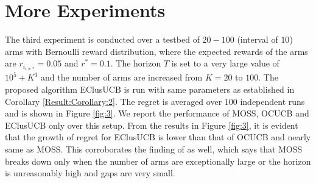 \section{More Experiments}
\label{App:MoreExp}

The third experiment is conducted over a testbed of $20-100$ (interval of $10$) arms with Bernoulli reward distribution, where the expected rewards of the arms are $r_{i_{{i}\neq {*}}}=0.05$ and $r^{*}=0.1$. The horizon $T$ is set to a very large value of $10^{5} + K^{3}$ and the number of arms are increased from $K=20$ to $100$. The proposed algorithm EClusUCB is run with same parameters as established in Corollary  \ref{Result:Corollary:2}. The regret is averaged over $100$ independent runs and is shown in Figure \ref{fig:3}. We report the performance of MOSS, OCUCB and EClusUCB only over this setup. From the results in Figure \ref{fig:3}, it is evident that the growth of regret for EClusUCB is lower than that of OCUCB and nearly same as MOSS. This corroborates the finding of \cite{lattimore2015optimally} as well, which says that MOSS breaks down only when the number of arms are exceptionally large or the horizon is unreasonably high and gaps are very small.

